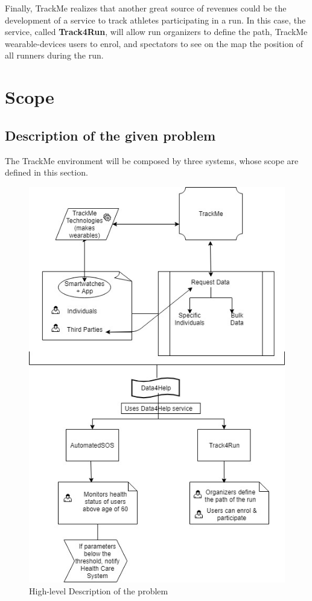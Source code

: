 \documentclass[12pt]{report}
\begin{document}
Finally, TrackMe realizes that another great source of revenues could be the development of a service to track athletes participating in a run. In this case, the service, called \textbf{Track4Run}, will allow run organizers to define the path, TrackMe wearable-devices users to enrol, and spectators to see on the map the position of all runners during the run. \\

\section{Scope}
\subsection{Description of the given problem}
The TrackMe environment will be composed by three systems, whose scope are defined in this section. \\

\begin{figure}[H]
\centering
\includegraphics[scale=0.45]{Diagrams/high_level.jpg}
\caption[High-level Description of the problem]{High-level Description of the problem}
\label{fig:High_level}
\end{figure}
\end{document}
